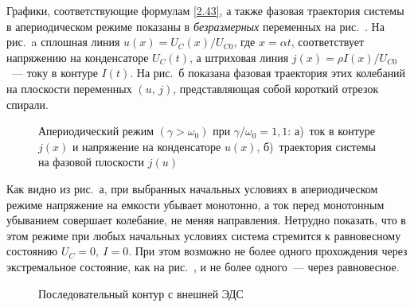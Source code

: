 Графики, соответствующие формулам \eqref{2.43}, а также фазовая траектория
системы в апериодическом режиме показаны в \emph{безразмерных} переменных на
рис.~. На рис.~a сплошная линия
$u(x)=U_C(x)/U_{C0}$, где $x=\alpha t$, соответствует напряжению на конденсаторе
$U_C(t)$, а штриховая линия $j(x)=\rho I(x)/U_{C0}$~--- току в контуре $I(t)$.
На рис.~б показана фазовая траектория этих колебаний на плоскости
переменных $(u,\,j)$, представляющая собой
короткий отрезок спирали.

\begin{figure}[h]
	\begin{minipage}[h]{0.49\linewidth}
		\centering\small
	\end{minipage}
	\hfill
	\begin{minipage}[h]{0.49\linewidth}
		\centering\small
	\end{minipage}
	\caption{Апериодический режим $(\gamma>\omega_0)$ при
$\gamma/\omega_0=1,1$: а)~ток в контуре $j(x)$ и напряжение на 
конденсаторе $u(x)$, б)~траектория системы на фазовой плоскости $j(u)$}
\end{figure}

Как видно из рис.~а, 
при выбранных начальных условиях в апериодическом режиме напряжение на емкости 
убывает монотонно, а ток перед монотонным убыванием
совершает колебание, не меняя направления. Нетрудно показать, что в этом режиме при
любых начальных условиях система стремится к равновесному состоянию
$U_C=0,~I=0$. При этом возможно не более одного прохождения через экстремальное
состояние, как на рис.~, и не более одного~--- через равновесное.

\label{sec:forced}

\label{sec:complex}

\begin{wrapfigure}[11]{o}{0.27\textwidth}
    \centering\small
    \caption{Последовательный контур с внешней ЭДС}
\end{wrapfigure}

